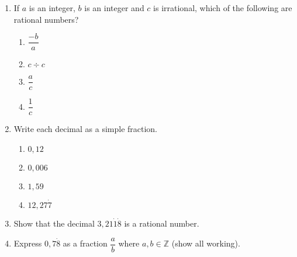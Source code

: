 \begin{eocexercises}{}


\begin{enumerate}[itemsep=5pt, label=\textbf{\arabic*}. ] 
\item If $a$ is an integer, $b$ is an integer and $c$ is irrational, which of the following are rational numbers?
    \begin{enumerate}[itemsep=5pt, label=\textbf{(\alph*)} ] 
    \item $\dfrac{-b}{a}$
    \item $c \div c$
    \item $\dfrac{a}{c}$
    \item $\dfrac{1}{c}$
    \end{enumerate}
\item Write each decimal as a simple fraction.
    \begin{enumerate}[itemsep=5pt, label=\textbf{(\alph*)} ] 
    \item $0,12$
    \item $0,006$
    \item $1,59$
    \item $12,27\dot{7}$
    \end{enumerate}
\item Show that the decimal $3,21\dot{1}\dot{8}$ is a rational number.
\item Express $0,7\dot{8}$ as a fraction $\dfrac{a}{b}$ where $a,b\in \mathbb{Z}$ (show all working).





\end{enumerate}
\end{eocexercises}

